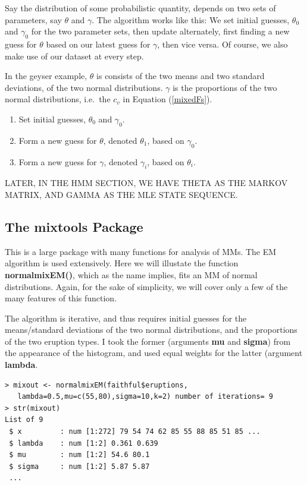 \documentclass[11pt]{article}
\begin{document}
Say the distribution of some probabilistic quantity, depends on two sets
of parameters, say $\theta$ and $\gamma$.  The algorithm works like
this:  We set initial guesses, $\theta_0$ and $\gamma_0$ for the two
parameter sets, then update alternately, first finding a new guess for
$\theta$ based on our latest guess for $\gamma$, then vice versa.  Of
course, we also make use of our dataset at every step.

In the geyser example, $\theta$ is consists of the two means and two
standard deviations, of the two normal distributions.  $\gamma$ is the
proportions of the two normal distributions, i.e.\ the $c_v$ in Equation
(\ref{mixedFs}).

\begin{enumerate}

\item Set initial guesses, $\theta_0$ and $\gamma_0$.

\item Form a new guess for $\theta$, denoted $\theta_1$, based
on $\gamma_0$.

\item Form a new guess for $\gamma$, denoted $\gamma_i$, based
on $\theta_i$.

\end{enumerate} 

LATER, IN THE HMM SECTION, WE HAVE THETA AS THE MARKOV MATRIX, AND GAMMA
AS THE MLE STATE SEQUENCE.

\subsection{The mixtools Package}

This is a large package with many functions for analysis of MMs.  The EM
algorithm is used extensively.  Here we will illustate the function
\textbf{normalmixEM()}, which as the name implies, fits an MM of normal
distributions.  Again, for the sake of simplicity, we will cover only a
few of the many features of this function.

The algorithm is iterative, and thus requires initial guesses for the
means/standard deviations of the two normal distributions, and the
proportions of the two eruption types.  I took the former (arguments
\textbf{mu} and \textbf{sigma}) from the appearance of the histogram,
and used equal weights for the latter (argument \textbf{lambda}.

\begin{lstlisting}
> mixout <- normalmixEM(faithful$eruptions,
   lambda=0.5,mu=c(55,80),sigma=10,k=2) number of iterations= 9 
> str(mixout)
List of 9
 $ x         : num [1:272] 79 54 74 62 85 55 88 85 51 85 ...
 $ lambda    : num [1:2] 0.361 0.639
 $ mu        : num [1:2] 54.6 80.1
 $ sigma     : num [1:2] 5.87 5.87
 ...
\end{lstlisting}
\end{document}
